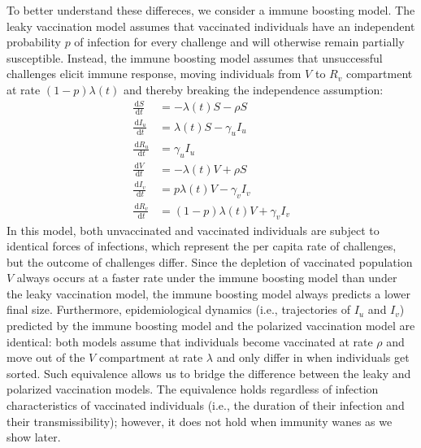 \documentclass[12pt]{article}
\newcommand{\dd}[1]{\ensuremath{\, \mathrm{d}#1}}
\begin{document}
To better understand these differeces, we consider a immune boosting model.
The leaky vaccination model assumes that vaccinated individuals have an independent probability $p$ of infection for every challenge and will otherwise remain partially susceptible.
Instead, the immune boosting model assumes that unsuccessful challenges elicit immune response, moving individuals from $V$ to $R_v$ compartment at rate $(1-p) \lambda(t)$ and thereby breaking the independence assumption: 
\begin{align}
\frac{\dd S}{\dd t} &= - \lambda(t) S - \rho S \\
\frac{\dd I_u}{\dd t} &= \lambda(t) S - \gamma_u I_u \\
\frac{\dd R_u}{\dd t} &= \gamma_u I_u \\
\frac{\dd V}{\dd t} &= - \lambda(t) V + \rho S \\
\frac{\dd I_v}{\dd t} &= p \lambda(t) V - \gamma_v I_v \\
\frac{\dd R_v}{\dd t} &= (1-p) \lambda(t) V + \gamma_v I_v
\end{align}
In this model, both unvaccinated and vaccinated individuals are subject to identical forces of infections, which represent the per capita rate of challenges, but the outcome of challenges differ.
Since the depletion of vaccinated population $V$ always occurs at a faster rate under the immune boosting model than under the leaky vaccination model, the immune boosting model always predicts a lower final size.
Furthermore, epidemiological dynamics (i.e., trajectories of $I_u$ and $I_v$) predicted by the immune boosting model and the polarized vaccination model are identical: 
both models assume that individuals become vaccinated at rate $\rho$ and move out of the $V$ compartment at rate $\lambda$ and only differ in when individuals get sorted.
Such equivalence allows us to bridge the difference between the leaky and polarized vaccination models.
The equivalence holds regardless of infection characteristics of vaccinated individuals (i.e., the duration of their infection and their transmissibility);
however, it does not hold when immunity wanes as we show later.
\end{document}
